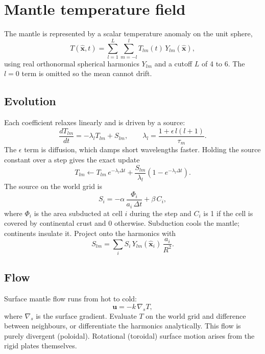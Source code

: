 \documentclass[11pt,a4paper]{article}
\newcommand{\vect}[1]{\bm{#1}}
\newcommand{\uu}{\vect{u}}
\newcommand{\gs}{\nabla_{\!s}}
\begin{document}
\section{Mantle temperature field}\label{sec:mantle}

The mantle is represented by a scalar temperature anomaly on the unit sphere,
\begin{equation}
T(\hat{\vect{x}}, t) = \sum_{l=1}^{L}\sum_{m=-l}^{l} T_{lm}(t)\,Y_{lm}(\hat{\vect{x}}),
\end{equation}
using real orthonormal spherical harmonics $Y_{lm}$ and a cutoff $L$ of 4 to
6. The $l = 0$ term is omitted so the mean cannot drift.

\subsection{Evolution}

Each coefficient relaxes linearly and is driven by a source:
\begin{equation}
\frac{dT_{lm}}{dt} = -\lambda_l T_{lm} + S_{lm},
\qquad
\lambda_l = \frac{1 + \epsilon\, l(l+1)}{\tau_m} .
\end{equation}
The $\epsilon$ term is diffusion, which damps short wavelengths faster.
Holding the source constant over a step gives the exact update
\begin{equation}
T_{lm} \leftarrow T_{lm}\,e^{-\lambda_l \Delta t}
 + \frac{S_{lm}}{\lambda_l}\left(1 - e^{-\lambda_l \Delta t}\right).
\end{equation}
The source on the world grid is
\begin{equation}
S_i = -\alpha\,\frac{\Phi_i}{a_i\,\Delta t} + \beta\,C_i ,
\end{equation}
where $\Phi_i$ is the area subducted at cell $i$ during the step and $C_i$ is
1 if the cell is covered by continental crust and 0 otherwise. Subduction
cools the mantle; continents insulate it. Project onto the harmonics with
\begin{equation}
S_{lm} = \sum_i S_i\, Y_{lm}(\hat{\vect{x}}_i)\,\frac{a_i}{R^2} .
\end{equation}

\subsection{Flow}

Surface mantle flow runs from hot to cold:
\begin{equation}
\uu = -k\,\gs T ,
\end{equation}
where $\gs$ is the surface gradient. Evaluate $T$ on the world grid and
difference between neighbours, or differentiate the harmonics analytically.
This flow is purely divergent (poloidal). Rotational (toroidal) surface motion
arises from the rigid plates themselves.
\end{document}
